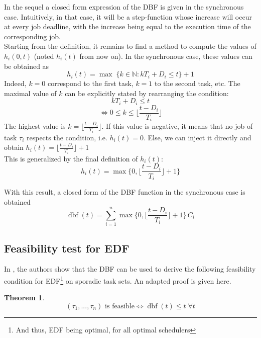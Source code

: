 \documentclass[a4paper,10pt]{article}
\newcommand{\dbf}[1]{\operatorname{dbf}(#1)}
\newtheorem{theorem}{Theorem}
\begin{document}
In the sequel a closed form expression of the DBF is given in the synchronous case. Intuitively, in that case, it will be a step-function whose increase will occur at every job deadline, with the increase being equal to the execution time of the corresponding job.\\

Starting from the definition, it remains to find a method to compute the values of $h_i(0, t)$ (noted $h_i(t)$ from now on). In the synchronous case, these values can be obtained as $$h_i(t) = \operatorname{max} \; \{ k \in \mathbb{N} : k T_i  + D_i \leq t \} + 1 $$ Indeed, $k = 0$ correspond to the first task, $k = 1$ to the second task, etc. The maximal value of $k$ can be explicitly stated by rearranging the condition:
$$k T_i + D_i \leq t$$
$$\iff 0 \leq k \leq \lfloor \frac{t - D_i}{T_i} \rfloor$$
The highest value is $k = \lfloor \frac{t - D_i}{T_i} \rfloor$. If this value is negative, it means that no job of task $\tau_i$ respects the condition, i.e. $h_i(t) = 0$. Else, we can inject it directly and obtain $h_i(t) = \lfloor \frac{t - D_i}{T_i} \rfloor + 1$\\

This is generalized by the final definition of $h_i(t)$: $$h_i(t) = \operatorname{max} \{ 0, \lfloor \frac{t - D_i}{T_i} \rfloor + 1 \}$$

With this result, a closed form of the DBF function in the synchronous case is obtained $$\dbf{t} = \sum_{i=1}^{n} \operatorname{max} \{ 0, \lfloor \frac{t - D_i}{T_i} \rfloor + 1 \} \, C_i$$

\subsection{Feasibility test for EDF}

In \cite{baruah1990algorithms}, the authors show that the DBF can be used to derive the following feasibility condition for EDF\footnote{And thus, EDF being optimal, for all optimal schedulers} on sporadic task sets. An adapted proof is given here.

\begin{theorem}
$$\text{$(\tau_1, ..., \tau_n)$ is feasible} \iff \dbf{t} \leq t \; \forall t$$
\end{theorem}
\end{document}
